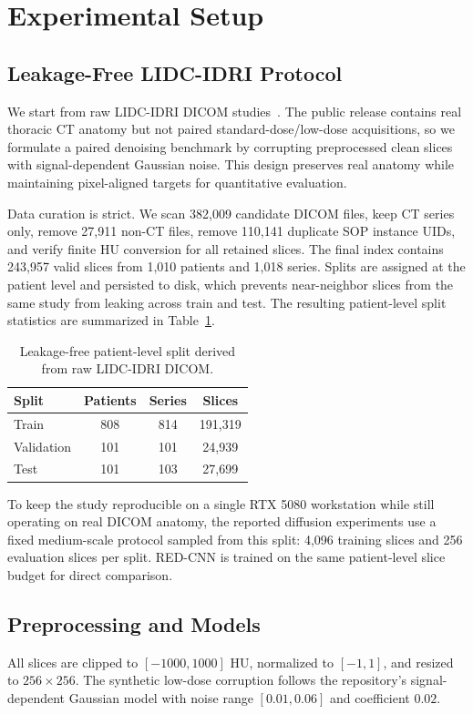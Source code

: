 \documentclass{article}
\begin{document}
\section{Experimental Setup}
\subsection{Leakage-Free LIDC-IDRI Protocol}
We start from raw LIDC-IDRI DICOM studies~\cite{armato2011}. The public release contains real thoracic CT anatomy but not paired standard-dose/low-dose acquisitions, so we formulate a paired denoising benchmark by corrupting preprocessed clean slices with signal-dependent Gaussian noise. This design preserves real anatomy while maintaining pixel-aligned targets for quantitative evaluation.

Data curation is strict. We scan 382{,}009 candidate DICOM files, keep CT series only, remove 27{,}911 non-CT files, remove 110{,}141 duplicate SOP instance UIDs, and verify finite HU conversion for all retained slices. The final index contains 243{,}957 valid slices from 1{,}010 patients and 1{,}018 series. Splits are assigned at the patient level and persisted to disk, which prevents near-neighbor slices from the same study from leaking across train and test. The resulting patient-level split statistics are summarized in Table~\ref{tab:split}.

\begin{table}[t]
\centering
\small
\caption{Leakage-free patient-level split derived from raw LIDC-IDRI DICOM.}
\label{tab:split}
\begin{tabular}{lccc}
\toprule
Split & Patients & Series & Slices \\
\midrule
Train & 808 & 814 & 191{,}319 \\
Validation & 101 & 101 & 24{,}939 \\
Test & 101 & 103 & 27{,}699 \\
\bottomrule
\end{tabular}
\end{table}

To keep the study reproducible on a single RTX 5080 workstation while still operating on real DICOM anatomy, the reported diffusion experiments use a fixed medium-scale protocol sampled from this split: 4{,}096 training slices and 256 evaluation slices per split. RED-CNN is trained on the same patient-level slice budget for direct comparison.

\subsection{Preprocessing and Models}
All slices are clipped to $[-1000, 1000]$ HU, normalized to $[-1,1]$, and resized to $256 \times 256$. The synthetic low-dose corruption follows the repository's signal-dependent Gaussian model with noise range $[0.01, 0.06]$ and coefficient $0.02$.
\end{document}
